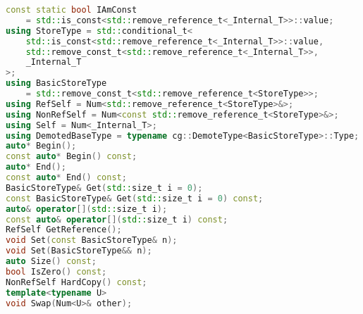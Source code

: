 \documentclass{article}
\begin{document}
\begin{lstlisting}[language=C++, label=code:9, caption=Special Members]
const static bool IAmConst 
	= std::is_const<std::remove_reference_t<_Internal_T>>::value;
using StoreType = std::conditional_t<
	std::is_const<std::remove_reference_t<_Internal_T>>::value,
	std::remove_const_t<std::remove_reference_t<_Internal_T>>,
	_Internal_T
>;
using BasicStoreType
	= std::remove_const_t<std::remove_reference_t<StoreType>>;
using RefSelf = Num<std::remove_reference_t<StoreType>&>;
using NonRefSelf = Num<const std::remove_reference_t<StoreType>&>;
using Self = Num<_Internal_T>;
using DemotedBaseType = typename cg::DemoteType<BasicStoreType>::Type;
auto* Begin();
const auto* Begin() const;
auto* End();
const auto* End() const;
BasicStoreType& Get(std::size_t i = 0);
const BasicStoreType& Get(std::size_t i = 0) const;
auto& operator[](std::size_t i);
const auto& operator[](std::size_t i) const;
RefSelf GetReference();
void Set(const BasicStoreType& n);
void Set(BasicStoreType&& n);
auto Size() const;
bool IsZero() const;
NonRefSelf HardCopy() const;
template<typename U>
void Swap(Num<U>& other);
\end{lstlisting}
\end{document}
